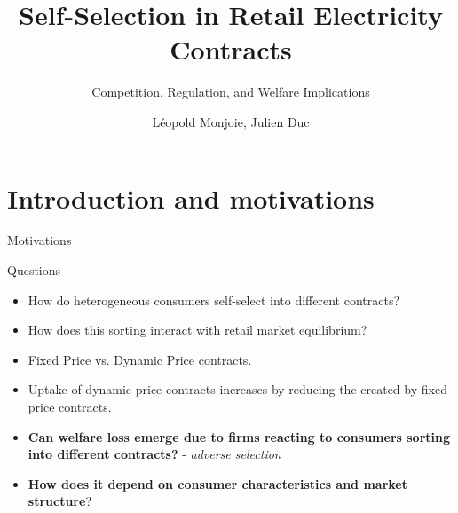 \documentclass{class}
\title{Self-Selection in Retail Electricity Contracts}
\subtitle{Competition, Regulation, and Welfare Implications}
\author{Léopold Monjoie, Julien Duc}
\institute{Aalto University \and Nantes University}
\begin{document}
\newlength{\tempb}

\frame{\titlepage}

\newcommand{\commentedbox}[2]{%
  \mbox{
    \begin{tabular}[t]{@{}c@{}}
    $\boxed{\displaystyle#1}$\\
    #2
    \end{tabular}%
  }%
}

\newcommand\Wider[2][3em]{%
\makebox[\linewidth][c]{%
  \begin{minipage}{\dimexpr\textwidth+#1\relax}
  \raggedright#2
  \end{minipage}%
  }%
}

\newcommand*\circled[1]{\tikz[baseline=(char.base)]{
            \node[shape=circle,draw,inner sep=2pt] (char) {#1};}}



\section{Introduction and motivations}

\begin{frame}{Motivations}\label{Motivations}

\begin{mainbox}{Questions}
\begin{itemize}
\vspace{0.15 cm}
    \item  How do heterogeneous consumers self-select into different contracts?
        \vspace{0.15 cm}
    \item How does this sorting interact with retail market equilibrium?
    \vspace{0.15 cm}
\end{itemize}
\end{mainbox}

\vfill

\begin{itemize}    

    \item Fixed Price vs. Dynamic Price contracts. 

    \vfill
   
    \item Uptake of dynamic price contracts increases  by reducing the  created by fixed-price contracts. \vfill
    
    \item \textbf{Can welfare loss emerge due to firms reacting to consumers sorting into different contracts?} - \textit{adverse selection}
    \vfill

    \item \textbf{How does it depend on consumer characteristics and market structure}? 
\end{itemize}

       
\end{frame}
\end{document}
